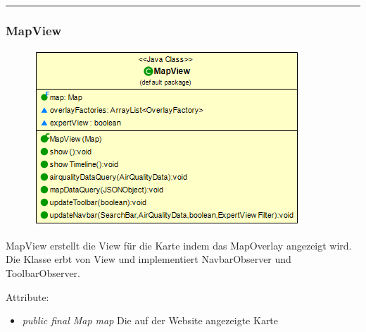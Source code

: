 \rule{\textwidth}{0.4pt}
\subsubsection{MapView}
\begin{minipage}{0.5\textwidth}
    \begin{figure}[H]
        {\centering\includegraphics[scale = 0.5
        ]{media/view/view/MapView_Class.png}}
    \end{figure}
    \end{minipage} \hfill
    \begin{minipage}{0.4\textwidth}
MapView erstellt die View für die Karte indem das MapOverlay angezeigt wird. Die Klasse erbt von View und implementiert NavbarObserver und ToolbarObserver.
\end{minipage}
\vspace{\baselineskip}
Attribute: \begin{itemize} [noitemsep]
     \item \emph{public final Map map} Die auf der Website angezeigte Karte
\end{itemize}
